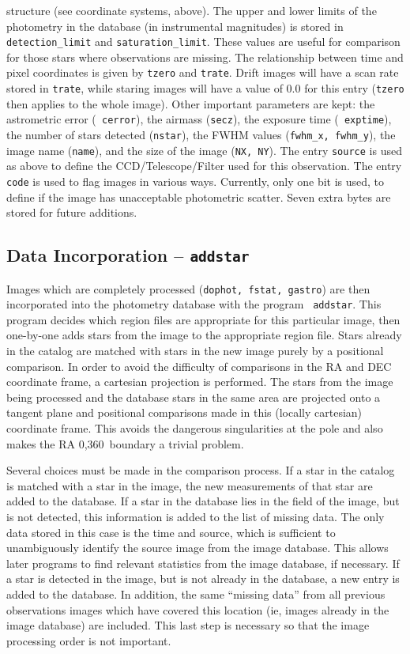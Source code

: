 \documentclass{article}
\begin{document}
structure (see coordinate systems, above).  The upper and lower limits
of the photometry in the database (in instrumental magnitudes) is
stored in {\tt detection\_limit} and {\tt saturation\_limit}.  These
values are useful for comparison for those stars where observations
are missing.  The relationship between time and pixel coordinates is
given by {\tt tzero} and {\tt trate}.  Drift images will have a scan
rate stored in {\tt trate}, while staring images will have a value of
0.0 for this entry ({\tt tzero} then applies to the whole image).
Other important parameters are kept: the astrometric error ({\tt
  cerror}), the airmass ({\tt secz}), the exposure time ({\tt
  exptime}), the number of stars detected ({\tt nstar}), the FWHM
values ({\tt fwhm\_x, fwhm\_y}), the image name ({\tt name}), and the
size of the image ({\tt NX, NY}).  The entry {\tt source} is used as
above to define the CCD/Telescope/Filter used for this observation.
The entry {\tt code} is used to flag images in various ways.
Currently, only one bit is used, to define if the image has
unacceptable photometric scatter.  Seven extra bytes are stored for
future additions.

\subsection{Data Incorporation -- {\tt addstar}}

Images which are completely processed ({\tt dophot, fstat, gastro}) are
then incorporated into the photometry database with the program {\tt 
addstar}.  This program decides which region files are appropriate
for this particular image, then one-by-one adds stars from the image
to the appropriate region file.  Stars already in the catalog are
matched with stars in the new image purely by a positional comparison.
In order to avoid the difficulty of comparisons in the RA and DEC
coordinate frame, a cartesian projection is performed.  The stars from
the image being processed and the database stars in the same area are
projected onto a tangent plane and positional comparisons made in this
(locally cartesian) coordinate frame.  This avoids the dangerous
singularities at the pole and also makes the RA 0,360\degree\ boundary
a trivial problem.  

Several choices must be made in the comparison process.  If a star in
the catalog is matched with a star in the image, the new measurements
of that star are added to the database.  If a star in the database
lies in the field of the image, but is not detected, this information
is added to the list of missing data.  The only data stored in this
case is the time and source, which is sufficient to unambiguously
identify the source image from the image database.  This allows later
programs to find relevant statistics from the image database, if
necessary.  If a star is detected in the image, but is not already in
the database, a new entry is added to the database.  In addition, the
same ``missing data'' from all previous observations images which have
covered this location (ie, images already in the image database) are
included.  This last step is necessary so that the image processing
order is not important.  
\end{document}
